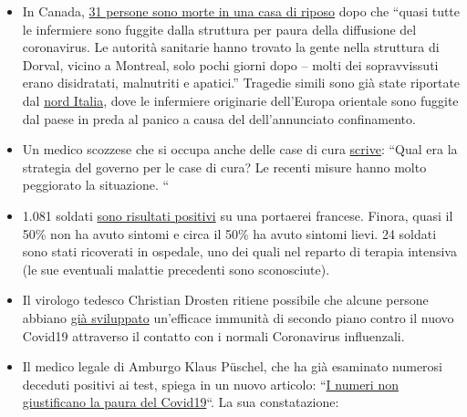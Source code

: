\begin{itemize}
{  gran parte vuoto} con soli 19 pazienti in trattamento presso la
  struttura, nel fine settimana di Pasqua. Gli ospedali di Londra hanno
  raddoppiato le loro capacità nei reparti di terapia intensiva e finora
  sono stati in grado di far fronte all'afflusso dei pazienti.
\item
  In Canada, \href{https://orf.at/stories/3162365/}{31 persone sono
  morte in una casa di riposo} dopo che ``quasi tutte le infermiere sono
  fuggite dalla struttura per paura della diffusione del coronavirus. Le
  autorità sanitarie hanno trovato la gente nella struttura di Dorval,
  vicino a Montreal, solo pochi giorni dopo -- molti dei sopravvissuti
  erano disidratati, malnutriti e apatici.'' Tragedie simili sono già
  state riportate dal
  \href{https://swprs.org/covid-19-a-report-from-italy/}{nord Italia},
  dove le infermiere originarie dell'Europa orientale sono fuggite dal
  paese in preda al panico a causa del dell'annunciato confinamento.
\item
  Un medico scozzese che si occupa anche delle case di cura
  \href{https://drmalcolmkendrick.org/2020/04/17/care-homes-and-covid19/}{scrive}:
  ``Qual era la strategia del governo per le case di cura? Le recenti
  misure hanno molto peggiorato la situazione. ``
\item
  1.081 soldati
  \href{https://www.ouest-france.fr/sante/virus/coronavirus/coronavirus-au-moins-940-marins-positifs-sur-le-charles-de-gaulle-et-son-escorte-6810816}{sono
  risultati positivi} su una portaerei francese. Finora, quasi il 50\%
  non ha avuto sintomi e circa il 50\% ha avuto sintomi lievi. 24
  soldati sono stati ricoverati in ospedale, uno dei quali nel reparto
  di terapia intensiva (le sue eventuali malattie precedenti sono
  sconosciute).
\item
  Il virologo tedesco Christian Drosten ritiene possibile che alcune
  persone abbiano \href{https://www.watson.de/!324026684}{già
  sviluppato} un'efficace immunità di secondo piano contro il nuovo
  Covid19 attraverso il contatto con i normali Coronavirus influenzali.
\item
  Il medico legale di Amburgo Klaus Püschel, che ha già esaminato
  numerosi deceduti positivi ai test, spiega in un nuovo articolo:
  ``\href{https://www.abendblatt.de/hamburg/article228908865/hamburg-corona-virus-uke-infektion-covid-19-pueschel-coronavirus-krise-patienten-impfstoff-immunitaet-krankenhaeuser-kontaktverbot-kliniken-infektionsrate-krankheit-pandemie-test-lungenkrankheit-sars-cov-epidemie-sars-cov-2.html}{I
  numeri non giustificano la paura del Covid19}``. La sua constatazione:

\end{itemize}
